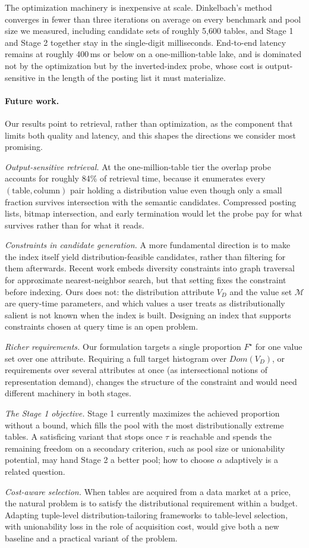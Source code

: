 The optimization machinery is inexpensive at scale. Dinkelbach's method converges in fewer
than three iterations on average on every benchmark and pool size we measured, including
candidate sets of roughly 5{,}600 tables, and Stage 1 and Stage 2 together stay in the
single-digit milliseconds. End-to-end latency remains at roughly 400\,ms or below on a
one-million-table lake, and is dominated not by the optimization but by the inverted-index
probe, whose cost is output-sensitive in the length of the posting list it must materialize.

\paragraph{Future work.}
Our results point to retrieval, rather than optimization, as the component that limits both
quality and latency, and this shapes the directions we consider most promising.

\emph{Output-sensitive retrieval.} At the one-million-table tier the overlap probe accounts
for roughly 84\% of retrieval time, because it enumerates every $(\text{table},
\text{column})$ pair holding a distribution value even though only a small fraction survives
intersection with the semantic candidates. Compressed posting lists, bitmap intersection, and
early termination would let the probe pay for what survives rather than for what it reads.

\emph{Constraints in candidate generation.} A more fundamental direction is to make the index
itself yield distribution-feasible candidates, rather than filtering for them afterwards.
Recent work embeds diversity constraints into graph traversal for approximate nearest-neighbor
search, but that setting fixes the constraint before indexing. Ours does not: the distribution
attribute $V_D$ and the value set $\mathcal{M}$ are query-time parameters, and which values a
user treats as distributionally salient is not known when the index is built. Designing an
index that supports constraints chosen at query time is an open problem.

\emph{Richer requirements.} Our formulation targets a single proportion $F^\star$ for one value
set over one attribute. Requiring a full target histogram over $Dom(V_D)$, or requirements over
several attributes at once (as intersectional notions of representation demand), changes the
structure of the constraint and would need different machinery in both stages.

\emph{The Stage 1 objective.} Stage 1 currently maximizes the achieved proportion without a
bound, which fills the pool with the most distributionally extreme tables. A satisficing
variant that stops once $\tau$ is reachable and spends the remaining freedom on a secondary
criterion, such as pool size or unionability potential, may hand Stage 2 a better pool; how to
choose $\alpha$ adaptively is a related question.

\emph{Cost-aware selection.} When tables are acquired from a data market at a price, the
natural problem is to satisfy the distributional requirement within a budget. Adapting
tuple-level distribution-tailoring frameworks to table-level selection, with unionability loss
in the role of acquisition cost, would give both a new baseline and a practical variant of the
problem.
